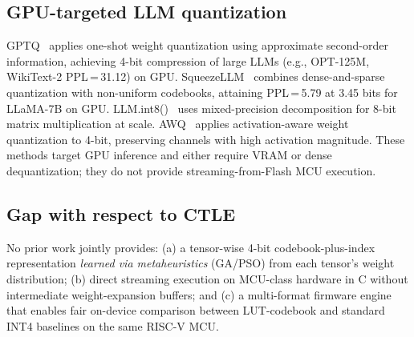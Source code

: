 \documentclass[lettersize,journal]{IEEEtran}
\begin{document}
\subsection{GPU-targeted LLM quantization}
GPTQ~\cite{frantar2023gptq} applies one-shot weight quantization using
approximate second-order information, achieving 4-bit compression of large
LLMs (e.g., OPT-125M, WikiText-2 PPL\,=\,31.12) on GPU.
SqueezeLLM~\cite{kim2024squeezellm} combines dense-and-sparse quantization with
non-uniform codebooks, attaining PPL\,=\,5.79 at 3.45 bits for LLaMA-7B on GPU.
LLM.int8()~\cite{dettmers2022llmint8} uses mixed-precision decomposition for
8-bit matrix multiplication at scale.
AWQ~\cite{lin2024awq} applies activation-aware weight quantization to 4-bit,
preserving channels with high activation magnitude.
These methods target GPU inference and either require VRAM or dense
dequantization; they do not provide streaming-from-Flash MCU execution.

\subsection{Gap with respect to CTLE}
No prior work jointly provides:
(a) a tensor-wise 4-bit codebook-plus-index representation
\emph{learned via metaheuristics} (GA/PSO) from each tensor's weight
distribution;
(b) direct streaming execution on MCU-class hardware in C without intermediate
weight-expansion buffers; and
(c) a multi-format firmware engine that enables fair on-device comparison
between LUT-codebook and standard INT4 baselines on the same RISC-V MCU.


\end{document}
